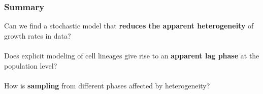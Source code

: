\documentclass{beamer}
\begin{document}
\begin{frame}
\frametitle{Summary}


Can we find a stochastic model that \textbf{reduces the apparent heterogeneity} of growth rates in data? \\~\\
\vspace{+1em}
Does explicit modeling of cell lineages give rise to an \textbf{apparent lag phase} at the population level? \\~\\
\vspace{+1em}
How is \textbf{sampling} from different phases affected by heterogeneity? 
\end{frame}
\usebackgroundtemplate{ }
\end{document}
